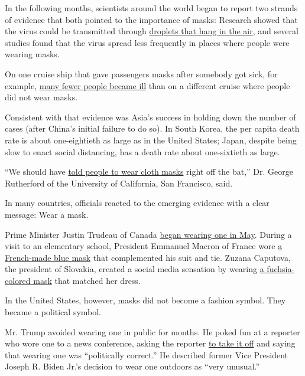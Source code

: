 In the following months, scientists around the world began to report two
strands of evidence that both pointed to the importance of masks:
Research showed that the virus could be transmitted through
\href{https://www.nytimes.com/2020/07/04/health/239-experts-with-one-big-claim-the-coronavirus-is-airborne.html}{droplets
that hang in the air}, and several studies found that the virus spread
less frequently in places where people were wearing masks.

On one cruise ship that gave passengers masks after somebody got sick,
for example,
\href{https://www.nytimes.com/2020/07/27/health/coronavirus-mask-protection.html}{many
fewer people became ill} than on a different cruise where people did not
wear masks.

Consistent with that evidence was Asia's success in holding down the
number of cases (after China's initial failure to do so). In South
Korea, the per capita death rate is about one-eightieth as large as in
the United States; Japan, despite being slow to enact social distancing,
has a death rate about one-sixtieth as large.

``We should have
\href{https://www.ucsf.edu/news/2020/06/417906/still-confused-about-masks-heres-science-behind-how-face-masks-prevent}{told
people to wear cloth masks} right off the bat,'' Dr. George Rutherford
of the University of California, San Francisco, said.

In many countries, officials reacted to the emerging evidence with a
clear message: Wear a mask.

Prime Minister Justin Trudeau of Canada
\href{https://www.deccanherald.com/international/justin-trudeau-puts-on-mask-canadians-urged-to-do-same-840092.html}{began
wearing one in May}. During a visit to an elementary school, President
Emmanuel Macron of France wore
\href{https://apnews.com/fe461ecbffacb67c747a3234300c90de}{a French-made
blue mask} that complemented his suit and tie. Zuzana Caputova, the
president of Slovakia, created a social media sensation by wearing
\href{https://twitter.com/pfarqeu/status/1265154039190151168}{a
fuchsia-colored mask} that matched her dress.

In the United States, however, masks did not become a fashion symbol.
They became a political symbol.

Mr. Trump avoided wearing one in public for months. He poked fun at a
reporter who wore one to a news conference, asking the reporter
\href{https://www.cbsnews.com/video/trump-mocks-those-wearing-face-masks-calling-it-politically-correct/}{to
take it off} and saying that wearing one was ``politically correct.'' He
described former Vice President Joseph R. Biden Jr.'s decision to wear
one outdoors as ``very unusual.''

